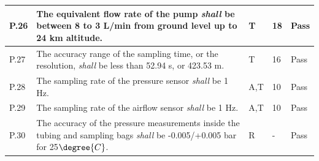 \documentclass[a4paper,12pt,oneside]{article}
\begin{document}
\begin{longtable}[]{|m{}| m{} |m{} |m{}|m{}|}
P.26 & The equivalent flow rate of the pump \textit{shall} be between 8 to 3 L/min from ground level up to 24 km altitude. & T & 18 & Pass \\ \hline

P.27 &  The accuracy range of the sampling time, or the resolution, \textit{shall} be less than 52.94 s, or 423.53 m. & T & 16 & Pass \\ \hline
P.28 & The sampling rate of the pressure sensor \textit{shall} be 1 Hz.                                                                                    &         A,T     & 10            &  Pass \\ \hline
P.29 & The sampling rate of the airflow sensor \textit{shall} be 1 Hz.                                                                                    &         A,T     & 10            & Pass  \\ \hline
P.30 & The accuracy of the pressure measurements inside the tubing and sampling bags \textit{shall} be -0.005/+0.005 bar for 25$\degree{C}$.                                                                              &        R      &  -          & Pass     \\ \hline %


\end{longtable}
\end{document}
